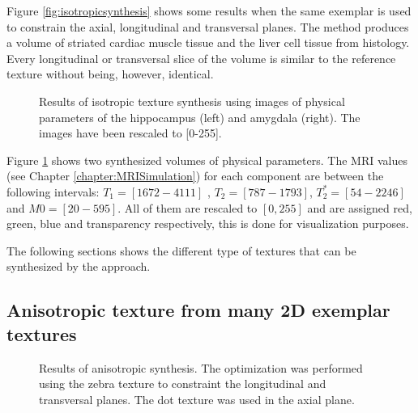 Figure \ref{fig:isotropicsynthesis} shows some results when the same exemplar is used to constrain 
the axial, longitudinal and transversal planes.
The method produces a volume of striated 
cardiac muscle tissue and the liver cell tissue from histology.
Every longitudinal or transversal slice of the volume is similar to the reference texture without being, however, identical.

\begin{figure}[h!]
 \centering
 \caption[Isotropic texture synthesis of physical parameters.]{Results of isotropic texture synthesis using images of physical parameters
          of the hippocampus (left) and amygdala (right). The images have been rescaled to [0-255].}
 \label{fig:isotropicsynthesisPhysical} 
\end{figure}

Figure \ref{fig:isotropicsynthesisPhysical} shows two synthesized volumes of physical parameters. 
The MRI values (see Chapter \ref{chapter:MRISimulation}) for each component are between the following intervals: 
$T_1 = [1672 - 4111]$ , $T_2 = [787 - 1793]$, $T_2^* = [54 - 2246]$ and $M0 = [20 - 595]$.
All of them are rescaled to $[0, 255]$ and are assigned red, green, blue and transparency respectively, this is done for visualization purposes.

The following sections shows the different type of textures that can be synthesized by the approach.

\subsection{Anisotropic texture from many 2D exemplar textures}

\begin{figure}[h!] 
 \centering 
 \caption[Anisotropic texture synthesis.]{Results of anisotropic synthesis. The optimization was performed using the zebra texture to constraint the longitudinal and transversal planes. The dot texture was used in the axial plane.}
 \label{fig:3DAnisotropicTexture} 
\end{figure}

